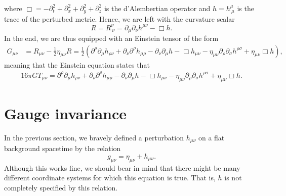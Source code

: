 \documentclass[twoside,utf8]{article}
\begin{document}
where $\Box = -\partial_t^2+\partial_x^2+\partial_y^2+\partial_z^2$ is the d'Alembertian operator and $h=h^\mu_{\ \mu}$ is the trace of the perturbed metric. Hence, we are left with the curvature scalar
\[
R = R^\nu_{\ \nu}
= \partial_\mu \partial_\nu h^{\mu\nu} - \Box h.
\]
In the end, we are thus equipped with an Einstein tensor of the form
\begin{align}
  G_{\mu\nu}
  &= R_{\mu\nu}-\frac{1}{2}\eta_{\mu\nu} R
  = \frac{1}{2}\left( \partial^\rho \partial_\mu h_{\rho\nu} + \partial_\nu \partial^\rho h_{\mu \rho} - \partial_\nu \partial_\mu h - \Box h_{\mu \nu}
  -\eta_{\mu\nu}\partial_\rho \partial_\sigma h^{\rho \sigma} + \eta_{\mu\nu}\Box h  \right), \label{eq:EinsteinTensor}
\end{align}
meaning that the Einstein equation states that
\begin{align}
  16\pi G T_{\mu\nu}
  = \partial^\rho \partial_\mu h_{\rho\nu} + \partial_\nu \partial^\rho h_{\mu \rho} - \partial_\nu \partial_\mu h - \Box h_{\mu \nu}
  -\eta_{\mu\nu}\partial_\rho \partial_\sigma h^{\rho \sigma} + \eta_{\mu\nu}\Box h. \label{eq:EinsteinEq}
\end{align}











\section{Gauge invariance}
In the previous section, we bravely defined a perturbation $h_{\mu\nu}$ on a flat background spacetime by the relation
\[
g_{\mu\nu} = \eta_{\mu\nu} + h_{\mu\nu}.
\]
Although this works fine, we should bear in mind that there might be many different coordinate systems for which this equation is true. That is, $h$ is not completely specified by this relation.
\end{document}
